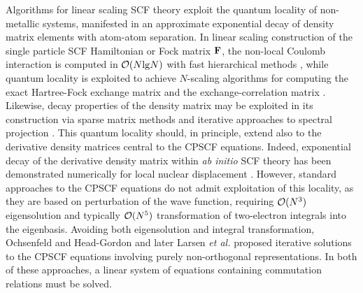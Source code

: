 \documentclass[prl,aps,twocolumn,showpacs,twocolumngrid,superbib]{revtex4}
\begin{document}
Algorithms for linear scaling SCF theory exploit the quantum locality
of non-metallic systems, manifested in an approximate exponential decay of density matrix elements
with atom-atom separation.  In linear scaling construction of the single particle SCF Hamiltonian 
or Fock matrix $\bf F$, the non-local  Coulomb interaction is computed in $ {\cal O}(N {\rm lg} N )$ 
with fast hierarchical methods \cite{Challacombe97b}, while  quantum locality is exploited to 
achieve $N$-scaling algorithms for computing the exact Hartree-Fock exchange matrix \cite{ESchwegler97} and the 
exchange-correlation matrix \cite{MChallacombe00A}.  Likewise, decay properties of the density matrix 
may be exploited  in its construction via sparse matrix methods and iterative approaches to spectral projection 
\cite{ANiklasson02A,ANiklasson03}.   This quantum locality should,  in principle, extend also to 
the derivative density matrices central to the CPSCF equations.  Indeed,  
exponential decay of the derivative density matrix within {\em ab initio} SCF theory has been demonstrated 
numerically for local nuclear displacement \cite{Ochsenfeld_1997}. However, standard approaches to the CPSCF equations 
\cite{Pople_1979,Sekino_1986,Dupuis_1991} do not admit exploitation of this locality, as they are based 
on perturbation of the wave function, requiring ${\cal O}(N^3)$ eigensolution and typically ${\cal O}(N^5)$ 
transformation of two-electron integrals into the eigenbasis.   Avoiding both 
eigensolution and integral transformation,  Ochsenfeld and Head-Gordon \cite{Ochsenfeld_1997} and
later Larsen {\em et al.} \cite{Helgaker_2001} proposed iterative solutions to the CPSCF equations 
involving purely non-orthogonal representations.   In both of these approaches, a 
linear system of equations containing commutation relations must be solved.
\end{document}
